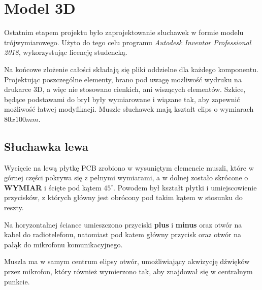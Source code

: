 \chapter{Model 3D}
\label{cha:model}

Ostatnim etapem projektu było zaprojektowanie słuchawek w formie modelu trójwymiarowego. Użyto do tego celu programu \textit{Autodesk Inventor Professional 2018}, wykorzystując licencję studencką. 

Na końcowe złożenie całości składają się pliki oddzielne dla każdego komponentu. Projektując poszczególne elementy, brano pod uwagę możliwość wydruku na drukarce 3D, a więc nie stosowano cienkich, ani wiszących elementów. Szkice, będące podstawami do brył były wymiarowane i wiązane tak, aby zapewnić możliwość łatwej modyfikacji. Muszle słuchawek mają kształt elips o wymiarach $80x100mm$.


\section{Słuchawka lewa}
\label{cha:model_lewa}

Wycięcie na lewą płytkę PCB zrobiono w wysuniętym elemencie muszli, które w górnej części pokrywa się z pełnymi wymiarami, a w dolnej zostało skrócone o \textbf{WYMIAR} i ścięte pod kątem $45^{\circ}$. Powodem był kształt płytki i umiejscowienie przycisków, z których główny jest obrócony pod takim kątem w stosunku do reszty.

Na horyzontalnej ściance umieszczono przyciski \textbf{plus} i \textbf{minus} oraz otwór na kabel do radiotelefonu, natomiast pod katem główny przycisk oraz otwór na pałąk do mikrofonu komunikacyjnego.

Muszla ma w samym centrum elipsy otwór, umożliwiający akwizycję dźwięków przez mikrofon, który również wymierzono tak, aby znajdował się w centralnym punkcie.


